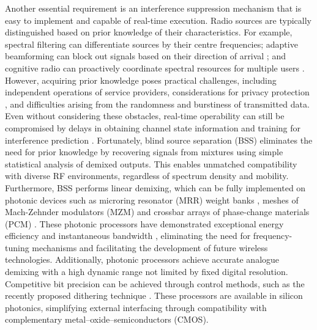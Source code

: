 \documentclass[pdflatex,mathphys]{sty}%
\begin{document}
Another essential requirement is an interference suppression mechanism that is easy to implement and capable of real-time execution. Radio sources are typically distinguished based on prior knowledge of their characteristics. For example, spectral filtering can differentiate sources by their centre frequencies; adaptive beamforming can block out signals based on their direction of arrival \cite{kutty2015beamforming, li2005robust}; and cognitive radio can proactively coordinate spectral resources for multiple users \cite{akyildiz2006next,haykin2005cognitive}. However, acquiring prior knowledge poses practical challenges, including independent operations of service providers, considerations for privacy protection \cite{fragkiadakis2012survey,clancy2008security,acquisti2006there}, and difficulties arising from the randomness and burstiness of transmitted data. Even without considering these obstacles, real-time operability can still be compromised by delays in obtaining channel state information and training for interference prediction \cite{selvi2018markov,biguesh2006training}. Fortunately, blind source separation (BSS) \cite{naik2014blind,choi2005blind} eliminates the need for prior knowledge by recovering signals from mixtures using simple statistical analysis of demixed outputs. This enables unmatched compatibility with diverse RF environments, regardless of spectrum density and mobility. Furthermore, BSS performs linear demixing, which can be fully implemented on photonic devices such as microring resonator (MRR) weight banks \cite{de2022design,zhang2022silicon,tait2016microring}, meshes of Mach-Zehnder modulators (MZM) \cite{perez2020multipurpose,perez2017multipurpose,clements2016optimal} and crossbar arrays of phase-change materials (PCM) \cite{fang2022ultra, feldmann2021parallel}. These photonic processors have demonstrated exceptional energy efficiency \cite{tait2022quantifying} and instantaneous bandwidth \cite{marpaung2019integrated,khan2010ultrabroad}, eliminating the need for frequency-tuning mechanisms and facilitating the development of future wireless technologies. Additionally, photonic processors achieve accurate analogue demixing with a high dynamic range not limited by fixed digital resolution. Competitive bit precision can be achieved through control methods, such as the recently proposed dithering technique \cite{zhang2022silicon}. These processors are available in silicon photonics, simplifying external interfacing through compatibility with complementary metal–oxide–semiconductors (CMOS).
\end{document}
